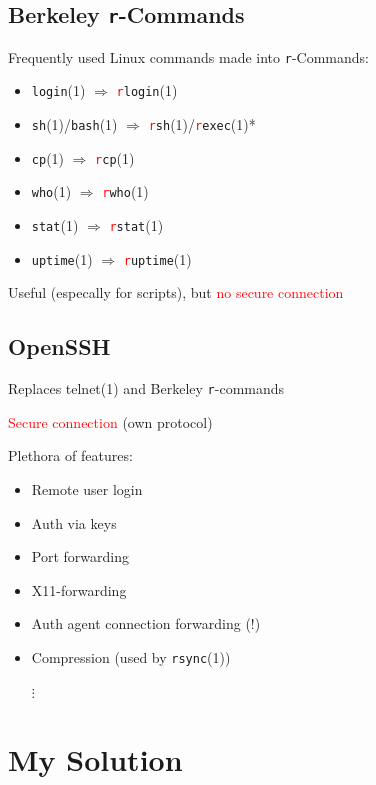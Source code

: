 \documentclass[
	xcolor=dvipsnames,
	handout
]{beamer}
\newenvironment{zhawframe}[1][]
{\begin{frame}[environment=fr,#1]{\insertsubsectionhead}{\insertsectionhead}}
{\end{frame}
}
\begin{document}
\subsection{Berkeley \texttt{r}-Commands}
\begin{zhawframe}
Frequently used Linux commands made into \texttt{r}-Commands:
\begin{itemize}
\item \texttt{login}(1) $\Rightarrow$ \texttt{\textcolor{red}{r}login}(1)
\item \texttt{sh}(1)/\texttt{bash}(1) $\Rightarrow$ \texttt{\textcolor{red}{r}sh}(1)/\texttt{\textcolor{red}{r}exec}(1)*
\item \texttt{cp}(1) $\Rightarrow$ \texttt{\textcolor{red}{r}cp}(1)
\item \texttt{who}(1) $\Rightarrow$ \texttt{\textcolor{red}{r}who}(1)
\item \texttt{stat}(1) $\Rightarrow$ \texttt{\textcolor{red}{r}stat}(1)
\item \texttt{uptime}(1) $\Rightarrow$ \texttt{\textcolor{red}{r}uptime}(1)
\end{itemize}
Useful (especally for scripts), but \textcolor{red}{no secure connection}
\end{zhawframe}

\subsection{OpenSSH}
\begin{zhawframe}
 Replaces telnet(1) and Berkeley \texttt{r}-commands

 \textcolor{red}{Secure connection} (own protocol)

 Plethora of features:
	\begin{itemize}
	\item<3-> Remote user login
	\item<3-> Auth via keys
	\item<3-> Port forwarding
	\item<3-> X11-forwarding
	\item<3-> Auth agent connection forwarding (!)
	\item<3-> Compression (used by \texttt{rsync}(1))

	\hspace{3mm}$\vdots$
	\end{itemize}
\end{zhawframe}

\section{My Solution}
\end{document}
